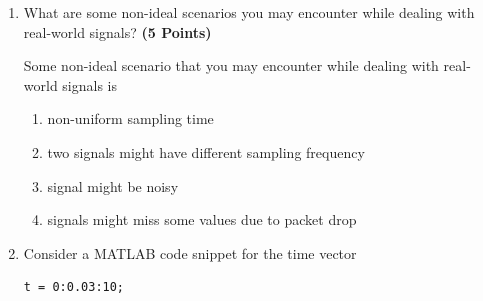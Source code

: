 \documentclass[12pt, xcolor=dvipsnames,svgnames,x11names]{article}
\begin{document}
\begin{enumerate}
\begin{tcolorbox}
Starting with two-point line equation form:
\begin{align*}
\frac{f(t)- f(t_1)}{t - t_1} & = \frac{f(t_2)  - f(t_1)}{t_2 - t_1}\\
\frac{f(t)- 6}{t - 3} & = \frac{12  - 6}{5 - 3}  = \frac{6}{2} = 3\\
\Rightarrow \frac{f(t) - 6}{t-3} & = 3
\end{align*}


So $t = 4$, 
\begin{align*}
\frac{f(t) - 6}{4-3} & = 3 \\
\frac{f(t) - 6}{1} & = 3\\
f(t) & = 6 + 3 = 9
\end{align*}
\end{tcolorbox}

\item What are some non-ideal scenarios you may encounter while dealing with real-world signals? \hfill \textbf{(5 Points)}

\begin{tcolorbox}[
    enhanced,breakable,
    colback=androidBlueLight!80,
    colframe=androidBlue,
    arc=5pt,
    boxrule=1pt,
    title=\textbf{Answer},
    fonttitle=\bfseries,
    coltitle=black,
    top=10pt,
    bottom=8pt,
    left=8pt,
    right=8pt,
    attach boxed title to top left={xshift=10pt, yshift=-\tcboxedtitleheight/2},
    boxed title style={
    colback=androidBlue,    
        colframe=androidBlue,
        arc=3pt,
        boxrule=0pt,
        left=6pt, right=6pt,
        top=3pt, bottom=3pt
    }
    ]

Some non-ideal scenario that you may encounter while dealing with real-world signals is
\begin{enumerate}
\item non-uniform sampling time
\item two signals might have different sampling frequency
\item signal might be noisy
\item signals might miss some values due to packet drop
\end{enumerate}

    
\end{tcolorbox}

\item Consider a MATLAB code snippet for the time vector

\begin{verbatim}
t = 0:0.03:10;
\end{verbatim}


\end{enumerate}
\end{document}
